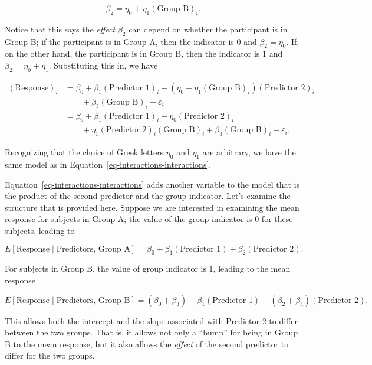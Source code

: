 \documentclass[
  letterpaper,
  DIV=11,
  numbers=noendperiod]{scrreprt}
\theoremstyle{definition}
\theoremstyle{definition}
\theoremstyle{remark}
\begin{document}
\[\beta_2 = \eta_0 + \eta_1 (\text{Group B})_i.\]

Notice that this says the \emph{effect} \(\beta_2\) can depend on
whether the participant is in Group B; if the participant is in Group A,
then the indicator is 0 and \(\beta_2 = \eta_0\). If, on the other hand,
the participant is in Group B, then the indicator is 1 and
\(\beta_2 = \eta_0 + \eta_1\). Substituting this in, we have

\[
\begin{aligned}
  (\text{Response})_i 
    &= \beta_0 + \beta_1 (\text{Predictor 1})_i + \left(\eta_0 + \eta_1 (\text{Group B})_i\right) (\text{Predictor 2})_i \\
    &\qquad + \beta_3 (\text{Group B})_i + \varepsilon_i \\
    &= \beta_0 + \beta_1 (\text{Predictor 1})_i + \eta_0 (\text{Predictor 2})_i \\
    &\qquad + \eta_1 (\text{Predictor 2})_i (\text{Group B})_i + \beta_3 (\text{Group B})_i + \varepsilon_i.
\end{aligned}
\]

Recognizing that the choice of Greek letters \(\eta_0\) and \(\eta_1\)
are arbitrary, we have the same model as in
Equation~\ref{eq-interactions-interactions}.

Equation~\ref{eq-interactions-interactions} adds another variable to the
model that is the product of the second predictor and the group
indicator. Let's examine the structure that is provided here. Suppose we
are interested in examining the mean response for subjects in Group A;
the value of the group indicator is 0 for these subjects, leading to

\[E\left[\text{Response} \mid \text{Predictors, Group A}\right] = \beta_0 + \beta_1  (\text{Predictor 1}) + \beta_2 (\text{Predictor 2}).\]

For subjects in Group B, the value of group indicator is 1, leading to
the mean response

\[E\left[\text{Response} \mid \text{Predictors, Group B}\right] = \left(\beta_0 + \beta_3\right) + \beta_1  (\text{Predictor 1}) + \left(\beta_2 + \beta_4\right) (\text{Predictor 2}).\]

This allows both the intercept and the slope associated with Predictor 2
to differ between the two groups. That is, it allows not only a ``bump''
for being in Group B to the mean response, but it also allows the
\emph{effect} of the second predictor to differ for the two groups.
\end{document}
